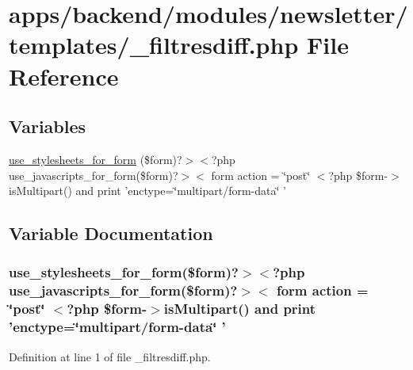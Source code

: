 \hypertarget{__filtresdiff_8php}{\section{apps/backend/modules/newsletter/templates/\-\_\-filtresdiff.php File Reference}
\label{__filtresdiff_8php}
}
\subsection*{Variables}
\begin{DoxyCompactItemize}
\item 
\hyperlink{__filtresdiff_8php_a00a269e565f040b15540e79f3fb02a19}{use\-\_\-stylesheets\-\_\-for\-\_\-form} (\$form)?$>$$<$?php use\-\_\-javascripts\-\_\-for\-\_\-form(\$form)?$>$$<$ form action = \char`\"{}post\char`\"{} $<$?php \$form-\/$>$is\-Multipart() and print 'enctype=\char`\"{}multipart/form-\/data\char`\"{} '
\end{DoxyCompactItemize}


\subsection{Variable Documentation}
\hypertarget{__filtresdiff_8php_a00a269e565f040b15540e79f3fb02a19}{
\subsubsection[{use\-\_\-stylesheets\-\_\-for\-\_\-form}]{\setlength{\rightskip}{0pt plus 5cm}use\-\_\-stylesheets\-\_\-for\-\_\-form(\$form)?$>$$<$?php use\-\_\-javascripts\-\_\-for\-\_\-form(\$form)?$>$$<$ form action = \char`\"{}post\char`\"{} $<$?php \$form-\/$>$is\-Multipart() and print 'enctype=\char`\"{}multipart/form-\/data\char`\"{} '}}\label{__filtresdiff_8php_a00a269e565f040b15540e79f3fb02a19}


Definition at line 1 of file \-\_\-filtresdiff.\-php.

